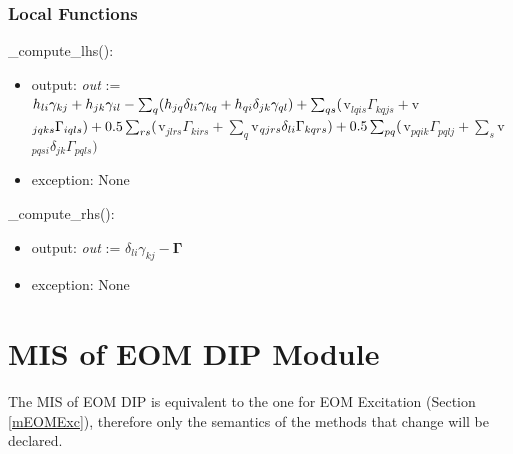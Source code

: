 \documentclass[12pt, titlepage]{article}
\begin{document}
%

\subsubsection{Local Functions}

\noindent \_compute\_lhs():
\begin{itemize}
	\item output: \textit{out} := \\
	$h_{li}\gamma_{kj} + h_{jk}\gamma_{il} - \sum_{q} 
	(h_{jq}\delta_{li}\gamma_{kq} + h_{qi}\delta_{jk}\gamma_{ql})\\
	+ \sum_{qs}($v$_{lqis}\Gamma_{kqjs} + $v$_{jqks}\Gamma_{iqls})\\
	+ 0.5\sum_{rs}($v$_{jlrs}\Gamma_{kirs} + 
	\sum_{q}$v$_{qjrs}\delta_{li}\Gamma_{kqrs})\\
	+ 0.5 \sum_{pq}($v$_{pqik}\Gamma_{pqlj} + 
	\sum_{s}$v$_{pqsi}\delta_{jk}\Gamma_{pqls})$
	\item exception: None 
\end{itemize}

\noindent\_compute\_rhs():
\begin{itemize}
	\item output: \textit{out} := $\delta_{li}\gamma_{kj} - 
	\boldsymbol{\Gamma}$
	\item exception: None 
\end{itemize}

\newpage

\section{MIS of EOM DIP Module} \label{mEOMDIP}
The MIS of EOM DIP is equivalent to the one for EOM Excitation (Section 
\ref{mEOMExc}), therefore only the semantics of the methods that change will be 
declared.
\end{document}
